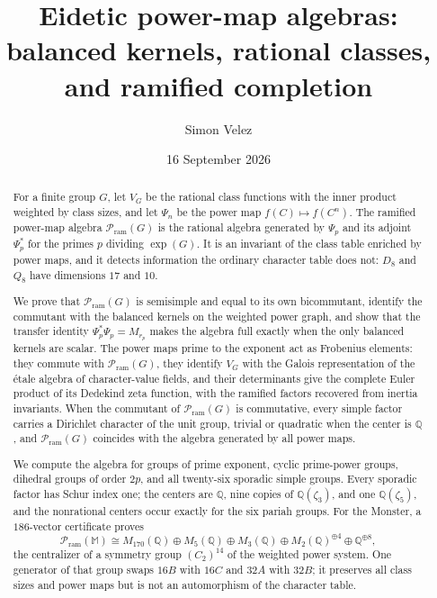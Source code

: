 \documentclass[11pt,reqno]{amsart}
\title[Eidetic power-map algebras]{Eidetic power-map algebras:
balanced kernels, rational classes, and ramified completion}
\author{Simon Velez}
\date{16 September 2026}
\numberwithin{equation}{section}
\theoremstyle{remark}
\theoremstyle{plain}
\newcommand{\Q}{\mathbb Q}
\newcommand{\M}{\mathbb M}
\newcommand{\Pram}{\mathcal P_{\mathrm{ram}}}
\newcommand{\1}{\mathbf 1}
\begin{document}
\begin{abstract}
For a finite group \(G\), let \(V_G\) be the rational class functions with
the inner product weighted by class sizes, and let \(\Psi_n\) be the power
map \(f(C)\mapsto f(C^n)\).  The ramified power-map algebra \(\Pram(G)\)
is the rational algebra generated by \(\Psi_p\) and its adjoint
\(\Psi_p^*\) for the primes \(p\) dividing \(\exp(G)\).  It is an
invariant of the class table enriched by power maps, and it detects
information the ordinary character table does not: \(D_8\) and \(Q_8\)
have dimensions \(17\) and \(10\).

We prove that \(\Pram(G)\) is semisimple and equal to its own bicommutant,
identify the commutant with the balanced kernels on the weighted power
graph, and show that the transfer identity \(\Psi_p^*\Psi_p=M_{r_p}\)
makes the algebra full exactly when the only balanced kernels are scalar.
The power maps prime to the exponent act as Frobenius elements: they
commute with \(\Pram(G)\), they identify \(V_G\) with the Galois
representation of the \'etale algebra of character-value fields, and their
determinants give the complete Euler product of its Dedekind zeta function,
with the ramified factors recovered from inertia invariants.  When the
commutant of \(\Pram(G)\) is commutative, every simple factor carries a
Dirichlet character of the unit group, trivial or quadratic when the center
is \(\Q\), and \(\Pram(G)\) coincides with the algebra generated by all
power maps.

We compute the algebra for groups of prime exponent, cyclic prime-power
groups, dihedral groups of order \(2p\), and all twenty-six sporadic simple
groups.  Every sporadic factor has Schur index one; the centers are \(\Q\),
nine copies of \(\Q(\zeta_3)\), and one \(\Q(\zeta_5)\), and the
nonrational centers occur exactly for the six pariah groups.  For the
Monster, a \(186\)-vector certificate proves
\[
 \Pram(\M)\cong M_{170}(\Q)\oplus M_5(\Q)\oplus M_3(\Q)
 \oplus M_2(\Q)^{\oplus4}\oplus\Q^{\oplus8},
\]
the centralizer of a symmetry group \((C_2)^{14}\) of the weighted power
system.  One generator of that group swaps \(16B\) with \(16C\) and
\(32A\) with \(32B\); it preserves all class sizes and power maps but is
not an automorphism of the character table.
\end{abstract}

\maketitle
\end{document}
